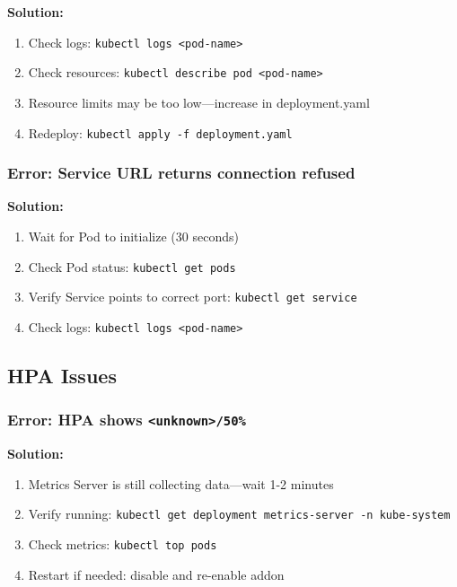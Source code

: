 \documentclass[12pt,a4paper]{article}
\begin{document}
\begin{warningbox}
\textbf{Solution:}
\begin{enumerate}
    \item Check logs: \texttt{kubectl logs <pod-name>}
    \item Check resources: \texttt{kubectl describe pod <pod-name>}
    \item Resource limits may be too low—increase in deployment.yaml
    \item Redeploy: \texttt{kubectl apply -f deployment.yaml}
\end{enumerate}
\end{warningbox}

\subsubsection{Error: Service URL returns connection refused}

\begin{warningbox}
\textbf{Solution:}
\begin{enumerate}
    \item Wait for Pod to initialize (30 seconds)
    \item Check Pod status: \texttt{kubectl get pods}
    \item Verify Service points to correct port: \texttt{kubectl get service}
    \item Check logs: \texttt{kubectl logs <pod-name>}
\end{enumerate}
\end{warningbox}

\subsection{HPA Issues}

\subsubsection{Error: HPA shows \texttt{<unknown>/50\%}}

\begin{warningbox}
\textbf{Solution:}
\begin{enumerate}
    \item Metrics Server is still collecting data—wait 1-2 minutes
    \item Verify running: \texttt{kubectl get deployment metrics-server -n kube-system}
    \item Check metrics: \texttt{kubectl top pods}
    \item Restart if needed: disable and re-enable addon
\end{enumerate}
\end{warningbox}
\end{document}
